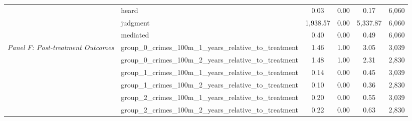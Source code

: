 \begin{tabular}{llcccc}
 & heard & 0.03 & 0.00 & 0.17 & 6,060 \\
 & judgment & 1,938.57 & 0.00 & 5,337.87 & 6,060 \\
 & mediated & 0.40 & 0.00 & 0.49 & 6,060 \\
\cline{1-6}
\multirow[c]{6}{4cm}{\textit{Panel F: Post-treatment Outcomes}} & group_0_crimes_100m_1_years_relative_to_treatment & 1.46 & 1.00 & 3.05 & 3,039 \\
 & group_0_crimes_100m_2_years_relative_to_treatment & 1.48 & 1.00 & 2.31 & 2,830 \\
 & group_1_crimes_100m_1_years_relative_to_treatment & 0.14 & 0.00 & 0.45 & 3,039 \\
 & group_1_crimes_100m_2_years_relative_to_treatment & 0.10 & 0.00 & 0.36 & 2,830 \\
 & group_2_crimes_100m_1_years_relative_to_treatment & 0.20 & 0.00 & 0.55 & 3,039 \\
 & group_2_crimes_100m_2_years_relative_to_treatment & 0.22 & 0.00 & 0.63 & 2,830 \\
\cline{1-6}
\bottomrule
\end{tabular}
